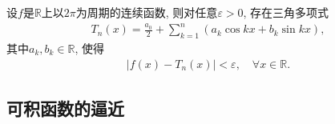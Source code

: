 \documentclass[../../main.tex]{subfiles}%
\begin{document}
\begin{theorem}[第二逼近定理]\label{theorem:第二逼近定理}
设$f$是$\mathbb{R}$上以$2\pi$为周期的连续函数, 则对任意$\varepsilon>0$, 存在三角多项式
\begin{align*}
T_n(x)=\frac{a_0}{2}+\sum\limits_{k=1}^{n}(a_k\cos kx+b_k\sin kx),
\end{align*}
其中$a_k,b_k\in\mathbb{R}$, 使得
\begin{align*}
|f(x)-T_n(x)|<\varepsilon,\quad \forall x\in\mathbb{R}.
\end{align*}
\end{theorem}

\subsection{可积函数的逼近}
\end{document}

